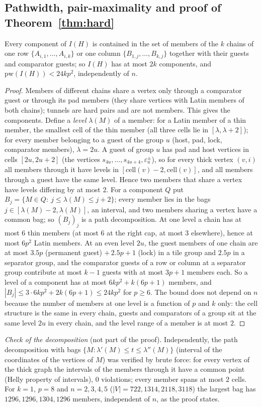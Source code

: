 \subsection{Pathwidth, pair-maximality and proof of Theorem~\ref{thm:hard}}\label{sec:hpwpm}
\begin{lemma}[Pathwidth]\label{lem:hpw}
Every component of $I(H)$ is contained in the set of members of the $k$ chains of one row $\{A_{i,1},\dots,A_{i,k}\}$ or one column $\{B_{1,j},\dots,B_{k,j}\}$ together with their guests and comparator guests; so $I(H)$ has at most $2k$ components, and $\mathrm{pw}(I(H))<24kp^2$, independently of $n$.
\end{lemma}
\begin{proof}
Members of different chains share a vertex only through a comparator guest or through its pad members (they share vertices with Latin members of both chains); tunnels are hard pairs and are not members. This gives the components. Define a \emph{level} $\lambda(M)$ of a member: for a Latin member of a thin member, the smallest cell of the thin member (all three cells lie in $[\lambda,\lambda+2]$); for every member belonging to a guest of the group $u$ (host, pad, lock, comparator members), $\lambda=2u$. A guest of group $u$ has pad and host vertices in cells $[2u,2u+2]$ (the vertices $s_{4u},\dots,s_{4u+4},\varepsilon^\pm_u$), so for every thick vertex $(v,i)$ all members through it have levels in $[\mathrm{cell}(v)-2,\mathrm{cell}(v)]$, and all members through a guest have the same level. Hence two members that share a vertex have levels differing by at most $2$. For a component $Q$ put $B_j=\{M\in Q:\ j\le\lambda(M)\le j+2\}$; every member lies in the bags $j\in[\lambda(M)-2,\lambda(M)]$, an interval, and two members sharing a vertex have a common bag; so $(B_j)_j$ is a path decomposition. At one level a chain has at most $6$ thin members (at most $6$ at the right cap, at most $3$ elsewhere), hence at most $6p^2$ Latin members. At an even level $2u$, the guest members of one chain are at most $3.5p$ (permanent guest) $+\,2.5p+1$ (lock) in a tile group and $2.5p$ in a separator group, and the comparator guests of a row or column at a separator group contribute at most $k-1$ guests with at most $3p+1$ members each. So a level of a component has at most $6kp^2+k(6p+1)$ members, and $|B_j|\le3\cdot6kp^2+2k(6p+1)\le24kp^2$ for $p\ge6$. The bound does not depend on $n$ because the number of members at one level is a function of $p$ and $k$ only: the cell structure is the same in every chain, guests and comparators of a group sit at the same level $2u$ in every chain, and the level range of a member is at most $2$.
\end{proof}
\emph{Check of the decomposition} (not part of the proof). Independently, the path decomposition with bags $\{M:\lambda'(M)\le t\le\lambda''(M)\}$ (interval of the coordinates of the vertices of $M$) was verified by brute force: for every vertex of the thick graph the intervals of the members through it have a common point (Helly property of intervals), $0$ violations; every member spans at most $2$ cells. For $k=1$, $p=8$ and $n=2,3,4,5$ ($|V|=722,1314,2118,3118$) the largest bag has $1296,1296,1304,1296$ members, independent of $n$, as the proof states.

